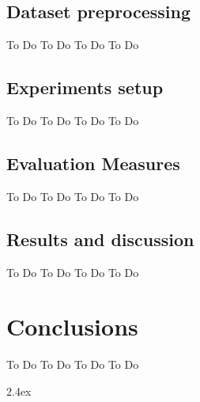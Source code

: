 \documentclass[conference]{IEEEtran}
\begin{document}
\subsection{Dataset preprocessing}
 To Do To Do
 To Do To Do
\subsection{Experiments setup}
 To Do To Do
 To Do To Do

\subsection{Evaluation Measures}
 To Do To Do
 To Do To Do
\subsection{Results and discussion}
 To Do To Do
 To Do To Do

%
%
\section{Conclusions}
 To Do To Do
 To Do To Do


\baselineskip 2.4ex 

\end{document}
